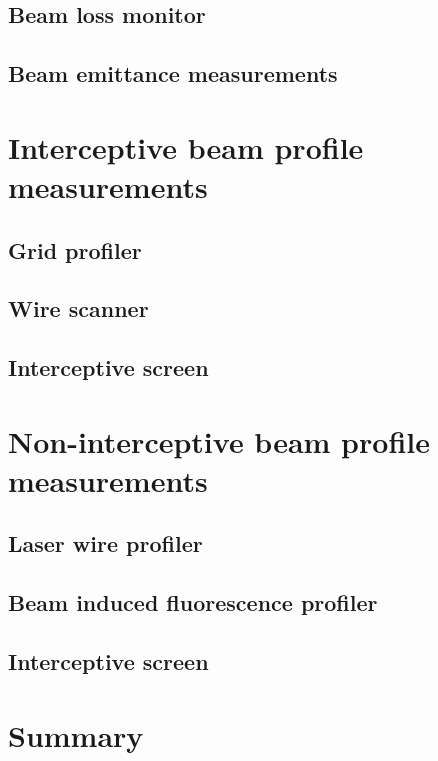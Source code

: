 \begin{refsection}
	\subsection{Beam loss monitor}
	\subsection{Beam emittance measurements}
	\section{Interceptive beam profile measurements}
	\subsection{Grid profiler}
	\subsection{Wire scanner}
	\subsection{Interceptive screen}
	\section{Non-interceptive beam profile measurements}
	\subsection{Laser wire profiler}
	\subsection{Beam induced fluorescence profiler}
	\subsection{Interceptive screen}
	\section{Summary}
	\label{ch2:Summary}
	\printbibliography[heading=subbibliography]
\end{refsection}